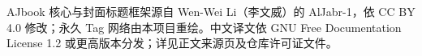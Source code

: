 \begin{titlepage}
\vspace{1.5em}
\noindent
\begin{minipage}[c]{0.25\textwidth}
  \centering
\end{minipage}\hfill
\begin{minipage}[c]{0.64\textwidth}
  \small\sffamily
  AJbook 核心与封面标题框架源自 Wen-Wei Li（李文威）的 AlJabr-1，依
  CC BY 4.0 修改；永久 Tag 网络由本项目重绘。中文译文依 GNU Free
  Documentation License 1.2 或更高版本分发；详见正文来源页及仓库许可证文件。
\end{minipage}

\cleardoublepage
\end{titlepage}

